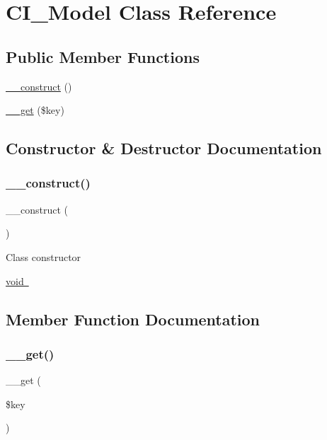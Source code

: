 \hypertarget{class_c_i___model}{}\section{C\+I\+\_\+\+Model Class Reference}
\label{class_c_i___model}
\subsection*{Public Member Functions}
\begin{DoxyCompactItemize}
\item 
\mbox{\hyperlink{class_c_i___model_a095c5d389db211932136b53f25f39685}{\+\_\+\+\_\+construct}} ()
\item 
\mbox{\hyperlink{class_c_i___model_a4537dad3b44254124991341cc91b28fb}{\+\_\+\+\_\+get}} (\$key)
\end{DoxyCompactItemize}


\subsection{Constructor \& Destructor Documentation}
\mbox{\label{class_c_i___model_a095c5d389db211932136b53f25f39685}} 
\subsubsection{\texorpdfstring{\+\_\+\+\_\+construct()}{\_\_construct()}}
{\footnotesize\ttfamily \+\_\+\+\_\+construct (\begin{DoxyParamCaption}{ }\end{DoxyParamCaption})}

Class constructor

\mbox{\hyperlink{}{void }}

\subsection{Member Function Documentation}
\mbox{\label{class_c_i___model_a4537dad3b44254124991341cc91b28fb}} 
\subsubsection{\texorpdfstring{\+\_\+\+\_\+get()}{\_\_get()}}
{\footnotesize\ttfamily \+\_\+\+\_\+get (\begin{DoxyParamCaption}\item[{}]{\$key }\end{DoxyParamCaption})}

